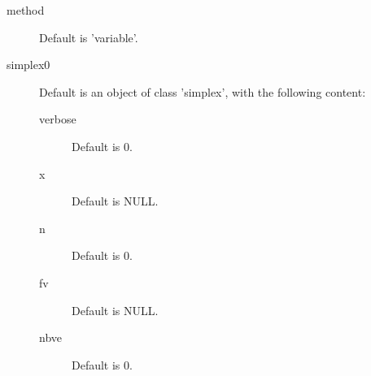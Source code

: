 \begin{Value}
\begin{description}
\begin{description}
\end{description}


\item[method] Default is 'variable'.
\item[simplex0] Default is an object of class 'simplex', with the following 
content:\begin{description}

\item[verbose] Default is 0.
\item[x] Default is NULL.
\item[n] Default is 0.
\item[fv] Default is NULL.
\item[nbve] Default is 0.

\end{description}



\end{description}
\end{Value}
